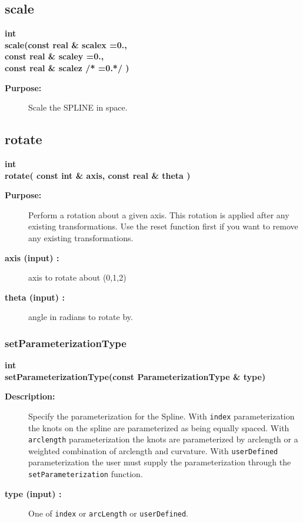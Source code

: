\subsection{scale}
 
\begin{flushleft} \textbf{%
int  \\ 
\settowidth{\SplineMappingIncludeArgIndent}{scale(}%
scale(const real \& scalex  =0., \\ 
\hspace{\SplineMappingIncludeArgIndent}const real \& scaley  =0., \\ 
\hspace{\SplineMappingIncludeArgIndent}const real \& scalez /* =0.*/ )
}\end{flushleft}
\begin{description}
\item[{\bf Purpose:}]  Scale the SPLINE in space.
\end{description}
\subsection{rotate}
 
\begin{flushleft} \textbf{%
int  \\ 
\settowidth{\SplineMappingIncludeArgIndent}{rotate(}%
rotate( const int \& axis, const real \& theta )
}\end{flushleft}
\begin{description}
\item[{\bf Purpose:}]  Perform a rotation about a given axis. This rotation is applied
   after any existing transformations. Use the reset function first if you
   want to remove any existing transformations.
\item[{\bf axis (input) :}]  axis to rotate about (0,1,2)
\item[{\bf theta (input) :}]  angle in radians to rotate by.
\end{description}
\subsubsection{setParameterizationType}
 
\begin{flushleft} \textbf{%
int  \\ 
\settowidth{\SplineMappingIncludeArgIndent}{setParameterizationType(}%
setParameterizationType(const ParameterizationType \& type)
}\end{flushleft}
\begin{description}
\item[{\bf Description:}] 
   Specify the parameterization for the Spline. With {\tt index} parameterization
 the knots on the spline are parameterized as being equally spaced. With {\tt arclength}
  parameterization the knots are parameterized by arclength or a weighted combination
 of arclength and curvature. With {\tt userDefined} parameterization the user must supply
 the parameterization through the {\tt setParameterization} function.
\item[{\bf type (input) :}]  One of {\tt index} or {\tt arcLength} or {\tt userDefined}.
\end{description}
